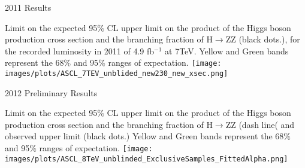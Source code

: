 \begin{frame}{2011 Results}
\begin{center}
\scriptsize
Limit on the expected 95$\%$ CL upper limit on the product of the Higgs boson production cross section and the branching fraction of H$\rightarrow$ZZ (black dots.), for the recorded luminosity in 2011 of 4.9 fb$^{-1}$ at 7TeV. Yellow and Green bands represent the 68$\%$ and 95$\%$ ranges of expectation.
\texttt{[image: images/plots/ASCL\_7TEV\_unblided\_new230\_new\_xsec.png]}
\end{center}
\end{frame}



\begin{frame}{2012 Preliminary Results}
\begin{center}
\scriptsize
Limit on the expected 95$\%$ CL upper limit on the product of the Higgs boson production cross section and the branching fraction of H$\rightarrow$ZZ (dash line( and observed upper limit (black dots.) Yellow and Green bands represent the 68$\%$ and 95$\%$ ranges of expectation.
\texttt{[image: images/plots/ASCL\_8TeV\_unblinded\_ExclusiveSamples\_FittedAlpha.png]}
\end{center}
\end{frame}
